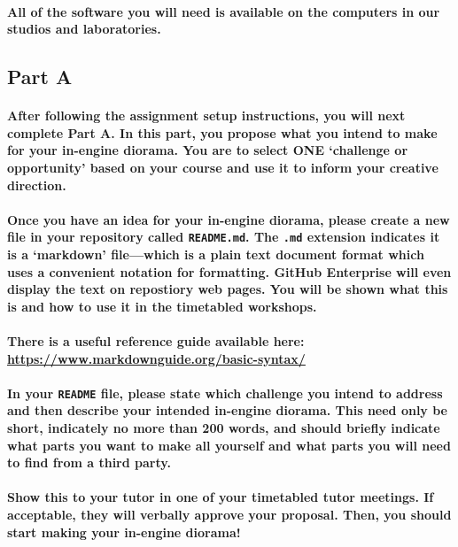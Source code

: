 \documentclass{../../fal_assignment}
\begin{document}
\paragraph{All of the software you will need is available on the computers in our studios and laboratories.}

\subsection*{Part A}

\paragraph{After following the assignment setup instructions, you will next complete Part A. In this part, you propose what you intend to make for your in-engine diorama. You are to select \textbf{ONE} `challenge or opportunity' based on your course and use it to inform your creative direction.} 

\paragraph{Once you have an idea for your in-engine diorama, please create a new file in your repository called \texttt{README.md}. The \texttt{.md} extension indicates it is a `markdown' file---which is a plain text document format which uses a convenient notation for formatting. GitHub Enterprise will even display the text on repostiory web pages. You will be shown what this is and how to use it in the timetabled workshops.}

\paragraph{There is a useful reference guide available here: \url{https://www.markdownguide.org/basic-syntax/}}

\paragraph{In your \texttt{README} file, please state which challenge you intend to address and then describe your intended in-engine diorama. This need only be short, indicately no more than 200 words, and should briefly indicate what parts you want to make all yourself and what parts you will need to find from a third party.}

\paragraph{Show this to your tutor in one of your timetabled tutor meetings. If acceptable, they will verbally approve your proposal. Then, you should start making your in-engine diorama!}
\end{document}
